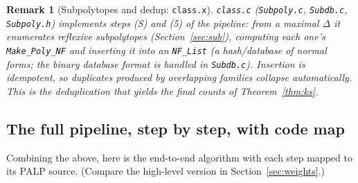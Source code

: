 \documentclass{amsart}
\newtheorem{remark}[theorem]{Remark}
\begin{document}
\begin{remark}[Subpolytopes and dedup: \texttt{class.x}]\label{rmk:class-code}
\texttt{class.c} (\texttt{Subpoly.c}, \texttt{Subdb.c}, \texttt{Subpoly.h})
implements steps (S) and (5) of the pipeline: from a maximal $\Delta$ it
enumerates reflexive subpolytopes (Section~\ref{sec:sub}), computing each
one's \texttt{Make\_Poly\_NF} and inserting it into an \texttt{NF\_List} (a
hash/database of normal forms; the binary database format is handled in
\texttt{Subdb.c}). Insertion is idempotent, so duplicates produced by
overlapping families collapse automatically. This is the deduplication that
yields the final counts of Theorem~\ref{thm:ks}.
\end{remark}

\subsection{The full pipeline, step by step, with code map}
\label{sec:algo-pipeline}

Combining the above, here is the end-to-end algorithm with each step mapped
to its PALP source. (Compare the high-level version in
Section~\ref{sec:weights}.)
\end{document}
